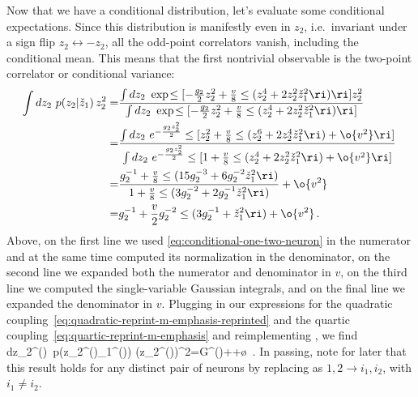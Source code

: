 Now that we have a conditional distribution, let's evaluate some conditional expectations. Since this distribution is manifestly even in $z_2$, i.e.~invariant under a sign flip $z_2\leftrightarrow-z_2$, all the odd-point correlators vanish, including the conditional mean. This means that the first nontrivial observable is the two-point correlator or conditional variance:
\begin{align}
\int dz_2\ p(z_2\vert \check{z}_1) \, z_2^2=&\frac{\int dz_2\ \exp\!\le[-\frac{g_2}{2}z_2^2+\frac{v}{8}\le(z_2^4+2z_2^2\check{z}_1^2\ri)\ri]z_2^2}{\int dz_2\ \exp\!\le[-\frac{g_2}{2}z_2^2+\frac{v}{8}\le(z_2^4+2z_2^2\check{z}_1^2\ri)\ri]}\, \label{eq:Hebbian-calc-middle}\\
=&\frac{\int dz_2\ e^{-\frac{g_2 z_2^2}{2}}\le[z_2^2+\frac{v}{8}\le(z_2^6+2z_2^4\check{z}_1^2\ri)+\o{v^2}\ri]}{\int dz_2\ e^{-\frac{g_2 z_2^2}{2}}\le[1+\frac{v}{8}\le(z_2^4+2z_2^2\check{z}_1^2\ri)+\o{v^2}\ri]}\, \notag\\
=&\frac{g_2^{-1}+\frac{v}{8}\le(15g_2^{-3}+6g_2^{-2}\check{z}_1^2\ri)}{1+\frac{v}{8}\le(3 g_2^{-2}+2g_2^{-1} \check{z}_1^2\ri)}+\o{v^2}\, \notag\\
=&g_2^{-1}+\frac{v}{2}g_2^{-2}\le(3 g_2^{-1}+\check{z}_1^2\ri)+\o{v^2}\, .\notag
\end{align}
Above, on the first line we used \eqref{eq:conditional-one-two-neuron} in the numerator and at the same time computed its normalization in the denominator,
on the second line we expanded both the numerator and denominator in $v$, on the third line we  
computed the single-variable Gaussian integrals, and on the final line we expanded the denominator in $v$.
Plugging in our expressions for the quadratic coupling~\eqref{eq:quadratic-reprint-m-emphasis-reprinted} and the quartic coupling~\eqref{eq:quartic-reprint-m-emphasis} and reimplementing , we find
\be\label{eq:conditional-variance}
\int dz_2^{(\ell)}\ p\!\le(z_2^{(\ell)}\Big\vert {}_1^{(\ell)}\ri) \le(z_2^{(\ell)}\ri)^2=G^{(\ell)}++\o{}\, .
\ee
In passing, note for later that
this result holds for any distinct pair of neurons by replacing  as $1,2\to i_1,i_2$, with $i_1\ne i_2$.


